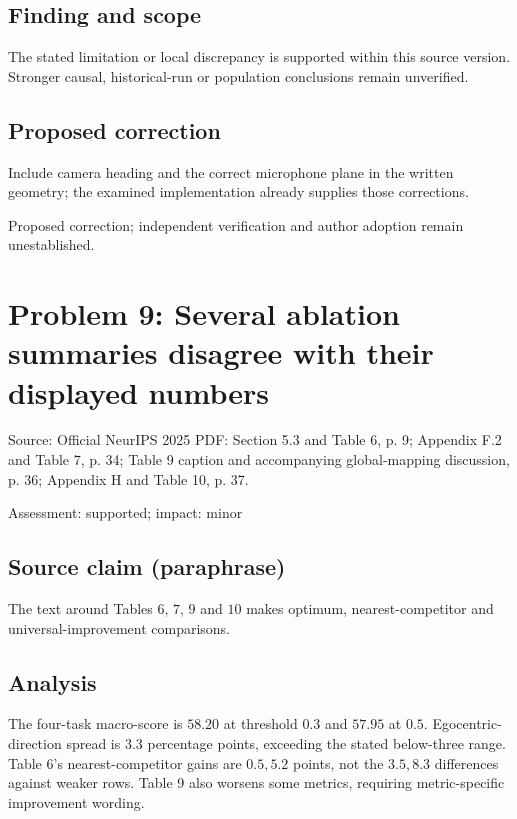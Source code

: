 \documentclass[11pt]{article}
\begin{document}
\subsection*{Finding and scope}

The stated limitation or local discrepancy is supported within this source version. Stronger causal, historical-run or population conclusions remain unverified.

\subsection*{Proposed correction}

Include camera heading and the correct microphone plane in the written geometry; the examined implementation already supplies those corrections.

Proposed correction; independent verification and author adoption remain unestablished.

\section*{Problem 9: Several ablation summaries disagree with their displayed numbers}

Source: Official NeurIPS 2025 PDF: Section 5.3 and Table 6, p. 9; Appendix F.2 and Table 7, p. 34; Table 9 caption and accompanying global-mapping discussion, p. 36; Appendix H and Table 10, p. 37.

Assessment: supported; impact: minor

\subsection*{Source claim (paraphrase)}

The text around Tables 6, \(7\), \(9\) and \(10\) makes optimum, nearest-competitor and universal-improvement comparisons.

\subsection*{Analysis}

The four-task macro-score is \(58.20\) at threshold \(0.3\) and \(57.95\) at \(0.5\). Egocentric-direction spread is \(3.3\) percentage points, exceeding the stated below-three range. Table 6's nearest-competitor gains are \(0.5,5.2\) points, not the \(3.5,8.3\) differences against weaker rows. Table 9 also worsens some metrics, requiring metric-specific improvement wording.
\end{document}
